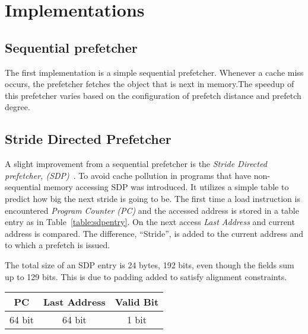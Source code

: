 \section{Implementations}


\subsection{Sequential prefetcher}
The first implementation is a simple sequential prefetcher.  Whenever
a cache miss occurs, the prefetcher fetches the object that is next in
memory.The speedup of this prefetcher varies based on the
configuration of prefetch distance and prefetch degree.

\subsection{Stride Directed Prefetcher}
A slight improvement from a sequential prefetcher is the
\textit{Stride Directed prefetcher, (SDP)}~\cite{sdp}.
To avoid cache pollution in programs that have non-sequential memory
accessing SDP was introduced. It utilizes a simple table to
predict how big the next stride is going to be. The first time a load
instruction is encountered \textit{Program Counter (PC)} and the
accessed address is stored in a table entry as in
Table~\ref{table:sdpentry}. On the next access \textit{Last Address}
and current address is compared. The difference, ``Stride'', is added
to the current address and to which a prefetch is issued.

The total size of an SDP entry is 24 bytes, 192 bits, even though the
fields sum up to 129 bits. This is due to padding added to satisfy
alignment constraints.

\begin{center}
  \begin{tabular}{ | c | c | c |}
    \hline
    PC & Last Address & Valid Bit \\ \hline
    64 bit & 64 bit & 1 bit \\ \hline
  \end{tabular}
  \label{table:sdpentry}
\end{center}


